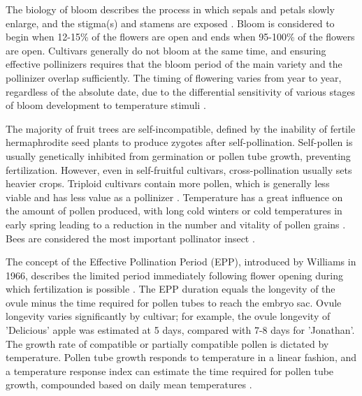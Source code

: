 \vspace{0.5em}
The biology of bloom describes the process in which sepals and petals slowly enlarge, and the stigma(s) and stamens are exposed \cite*{rmb_01_physiology_temperate_zone_fruit_trees}. Bloom is considered to begin when 12-15\% of the flowers are open and ends when 95-100\% of the flowers are open. Cultivars generally do not bloom at the same time, and ensuring effective pollinizers requires that the bloom period of the main variety and the pollinizer overlap sufficiently. The timing of flowering varies from year to year, regardless of the absolute date, due to the differential sensitivity of various stages of bloom development to temperature stimuli \cite*{rmb_01_physiology_temperate_zone_fruit_trees}.

\vspace{0.5em}
The majority of fruit trees are self-incompatible, defined by the inability of fertile hermaphrodite seed plants to produce zygotes after self-pollination. Self-pollen is usually genetically inhibited from germination or pollen tube growth, preventing fertilization. However, even in self-fruitful cultivars, cross-pollination usually sets heavier crops. Triploid cultivars contain more pollen, which is generally less viable and has less value as a pollinizer \cite*{rmb_01_physiology_temperate_zone_fruit_trees}. Temperature has a great influence on the amount of pollen produced, with long cold winters or cold temperatures in early spring leading to a reduction in the number and vitality of pollen grains \cite*{rmb_01_physiology_temperate_zone_fruit_trees}. Bees are considered the most important pollinator insect \cite*{rmb_01_physiology_temperate_zone_fruit_trees}.

\vspace{0.5em}
The concept of the Effective Pollination Period (EPP), introduced by Williams in 1966, describes the limited period immediately following flower opening during which fertilization is possible \cite*{rmb_01_physiology_temperate_zone_fruit_trees}. The EPP duration equals the longevity of the ovule minus the time required for pollen tubes to reach the embryo sac. Ovule longevity varies significantly by cultivar; for example, the ovule longevity of 'Delicious' apple was estimated at 5 days, compared with 7-8 days for 'Jonathan'. The growth rate of compatible or partially compatible pollen is dictated by temperature. Pollen tube growth responds to temperature in a linear fashion, and a temperature response index can estimate the time required for pollen tube growth, compounded based on daily mean temperatures \cite*{rmb_01_physiology_temperate_zone_fruit_trees}.

